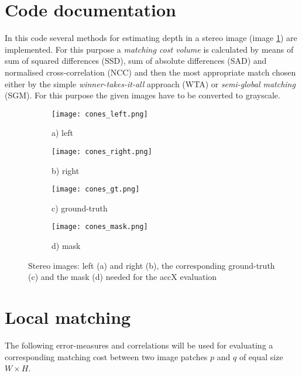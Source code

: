 \documentclass{article}
\begin{document}
\noindent

\section*{Code documentation}

In this code several methods for estimating depth in a stereo image (image \ref{fig:Stereo}) are implemented. For this purpose a \textit{matching cost volume} is calculated by means of sum of squared differences (SSD), sum of absolute differences (SAD) and normalised cross-correlation (NCC) and then the most appropriate match chosen either by the simple \textit{winner-takes-it-all} approach (WTA) or \textit{semi-global matching} (SGM). For this purpose the given images have to be converted to grayscale.

\begin{figure}[!htb]
	\captionsetup[subfigure]{labelformat=empty}
	\centering
	\begin{adjustbox}{minipage=\linewidth,scale=0.95}
		\begin{subfigure}{0.45\textwidth}
			\centering
			\texttt{[image: cones\_left.png]}
			\caption{a) left}
		\end{subfigure}
		\begin{subfigure}{0.45\textwidth}
			\centering
			\texttt{[image: cones\_right.png]}
			\caption{b) right}
		\end{subfigure}%
		\par \bigskip
		\begin{subfigure}{0.45\textwidth}
			\centering
			\texttt{[image: cones\_gt.png]}
			\caption{c) ground-truth}
		\end{subfigure}
		\begin{subfigure}{0.45\textwidth}
			\centering
			\texttt{[image: cones\_mask.png]}
			\caption{d) mask}
		\end{subfigure}%
	\end{adjustbox}
	\caption[Input]{Stereo images: left (a) and right (b), the corresponding ground-truth (c) and the mask (d) needed for the accX evaluation}
	\label{fig:Stereo}
\end{figure}


\section{Local matching}
The following error-measures and correlations will be used for evaluating a corresponding matching cost between two image patches $p$ and $q$ of equal size $W \times H$.
\end{document}
